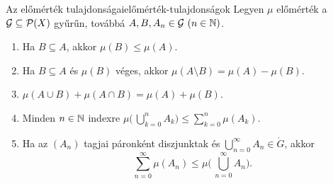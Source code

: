 \documentclass[
]{elteikthesis}[2024/04/26]
\begin{document}
	\begin{theorem}{Az előmérték tulajdonságai}{előmérték-tulajdonságok}
		Legyen \( \mu \) előmérték a \( \mathcal{G} \subseteq \mathcal{P}( X ) \) gyűrűn,
		továbbá \( A, B, A_n \in \mathcal{G} \ (n \in \mathbb{N}) \).
		
		\begin{enumerate}[label=\arabic*.]
			\item\label{th:előmérték-monoton}
			Ha \( B \subseteq A \), akkor \( \mu(B) \leq \mu(A) \).
			
			\item\label{th:előmérték-különbség-mértéke}
			Ha \( B \subseteq A \) és  \( \mu(B) \) véges,
			akkor \( \mu(A \setminus B) = \mu(A) - \mu(B) \).
			
			\item\label{th:előmérték-szita-formula}
			\( \mu(A \cup B) + \mu(A \cap B) = \mu(A) + \mu(B) \).
			
			\item\label{th:előmérték-véges-szubadditív}
			Minden \( n \in \mathbb{N} \) indexre 
			\( \mu \biggl(\, \bigcup\limits_{k=0}^n \! A_k \biggr) \leq \sum\limits_{k=0}^n \mu( A_k ) \).
			
			\item\label{th:előmérték-szubadditívitás-kiterjesztése}
			Ha az \( (A_n) \) tagjai páronként diszjunktak
			és \( \bigcup\limits_{n=0}^{\infty} \! A_n \in \ring{G} \), akkor
			\[
				\sum\limits_{n=0}^{\infty} \mu( A_n ) \leq
				\mu \Biggl(\, \bigcup\limits_{n=0}^{\infty} \! A_n \Biggr).
			\]
		\end{enumerate}
	\end{theorem}
\end{document}

